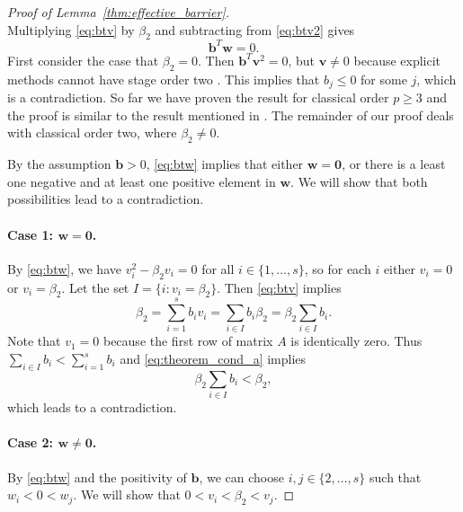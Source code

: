 \begin{proof}[Proof of Lemma~\ref{thm:effective_barrier}]
\begin{equation}
	\end{equation}
        Multiplying \eqref{eq:btv} by $\beta_2$ and subtracting
        from \eqref{eq:btv2} gives
	\begin{equation}\label{eq:btw}
		\bm{b}^T\bm{w} = 0.
	\end{equation}
	First consider the case that $\beta_2 = 0$. 
	Then $\bm{b}^T\bm{v}^2 = 0$, but $\bm{v }\neq 0$ because explicit methods
	cannot have stage order two \cite{Ruuth2002}. This implies that $b_j \leq 0$ 
	for some $j$, which is a contradiction.
	So far we have proven the result for classical order $p \ge 3$ 
	and the proof is similar to the result mentioned in \cite{Ruuth2002}. 
	The remainder of our proof deals with classical order two, 
	where $\beta_2 \neq 0$.

	By the assumption $\bm{b}>0$, \eqref{eq:btw} implies that either
	$\bm{w} = \bm{0}$, or there is a least one negative and at least one positive 
	element in $\bm{w}$.
	We will show that both possibilities lead to a contradiction.

	\paragraph{Case 1: $\bm{w} = \bm{0}$.}
	By \eqref{eq:btw}, we have $v_i^2 - \beta_2 v_i = 0$ for all $i \in \{1, \dots, s\}$, 
	so for each $i$ either $v_i = 0$ or $v_i = \beta_2$.
	Let the set $I = \{i : v_i = \beta_2\}$. 
	Then \eqref{eq:btv} implies 
	\begin{equation*}
		\beta_2 = \sum_{i=1}^s b_i v_i = \sum_{i \in I}b_i\beta_2 = \beta_2\sum_{i \in I}b_i.
	\end{equation*}
	Note that $v_1 = 0$ because the first row of matrix $A$ is identically zero. 
	Thus $\sum_{i\in I}b_i < \sum_{i=1}^s b_i$ and \eqref{eq:theorem_cond_a} 
	implies
	\begin{equation*}
		\beta_2\sum_{i \in I}b_i< \beta_2,
	\end{equation*} 
	which leads to a contradiction.

	\paragraph{Case 2: $\bm{w} \neq \bm{0}$.}
	By \eqref{eq:btw} and the positivity of $\bm{b}$, we can choose
	$i, j \in \{2, \dots, s\}$ such that $w_i < 0 < w_j$.
	We will show that $0 < v_i < \beta_2 < v_j$.


\end{proof}

